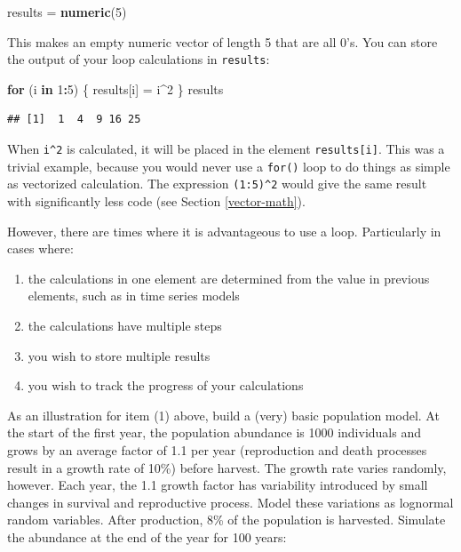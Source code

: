 \documentclass[]{book}
\newenvironment{Shaded}{\begin{snugshade}}{\end{snugshade}}
\newcommand{\ControlFlowTok}[1]{\textcolor[rgb]{0.13,0.29,0.53}{\textbf{#1}}}
\newcommand{\DecValTok}[1]{\textcolor[rgb]{0.00,0.00,0.81}{#1}}
\newcommand{\KeywordTok}[1]{\textcolor[rgb]{0.13,0.29,0.53}{\textbf{#1}}}
\newcommand{\NormalTok}[1]{#1}
\newcommand{\OperatorTok}[1]{\textcolor[rgb]{0.81,0.36,0.00}{\textbf{#1}}}
\newcommand{\StringTok}[1]{\textcolor[rgb]{0.31,0.60,0.02}{#1}}
\providecommand{\tightlist}{%
  \setlength{\itemsep}{0pt}\setlength{\parskip}{0pt}}
\begin{document}
\begin{Shaded}
\begin{Highlighting}[]
\NormalTok{results =}\StringTok{ }\KeywordTok{numeric}\NormalTok{(}\DecValTok{5}\NormalTok{)}
\end{Highlighting}
\end{Shaded}

This makes an empty numeric vector of length 5 that are all 0's. You can store the output of your loop calculations in \texttt{results}:

\begin{Shaded}
\begin{Highlighting}[]
\ControlFlowTok{for}\NormalTok{ (i }\ControlFlowTok{in} \DecValTok{1}\OperatorTok{:}\DecValTok{5}\NormalTok{) \{}
\NormalTok{  results[i] =}\StringTok{ }\NormalTok{i}\OperatorTok{^}\DecValTok{2}
\NormalTok{\}}
\NormalTok{results}
\end{Highlighting}
\end{Shaded}

\begin{verbatim}
## [1]  1  4  9 16 25
\end{verbatim}

When \texttt{i\^{}2} is calculated, it will be placed in the element \texttt{results{[}i{]}}. This was a trivial example, because you would never use a \texttt{for()} loop to do things as simple as vectorized calculation. The expression \texttt{(1:5)\^{}2} would give the same result with significantly less code (see Section \ref{vector-math}).

However, there are times where it is advantageous to use a loop. Particularly in cases where:

\begin{enumerate}
\def\labelenumi{\arabic{enumi}.}
\tightlist
\item
  the calculations in one element are determined from the value in previous elements, such as in time series models
\item
  the calculations have multiple steps
\item
  you wish to store multiple results
\item
  you wish to track the progress of your calculations
\end{enumerate}

As an illustration for item (1) above, build a (very) basic population model. At the start of the first year, the population abundance is 1000 individuals and grows by an average factor of 1.1 per year (reproduction and death processes result in a growth rate of 10\%) before harvest. The growth rate varies randomly, however. Each year, the 1.1 growth factor has variability introduced by small changes in survival and reproductive process. Model these variations as lognormal random variables. After production, 8\% of the population is harvested. Simulate the abundance at the end of the year for 100 years:
\end{document}
